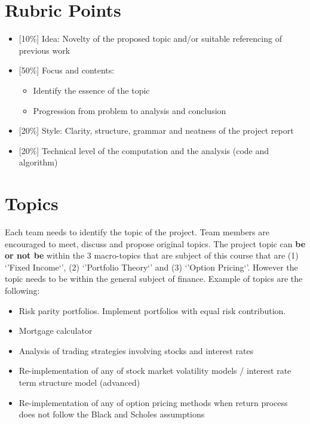 \documentclass[a4paper,11pt]{article} %
\begin{document}
\vspace{0.5cm}
\section{\textbf{Rubric Points}}
\begin{itemize}
	\item {[10\%] Idea: Novelty of the proposed topic and/or suitable referencing of previous work}
	\item {[50\%] Focus and contents: }
	\begin{itemize}
		\item Identify the essence of the topic
		\item Progression from problem to analysis and conclusion
	\end{itemize}

	\item {[20\%] Style: Clarity, structure, grammar and neatness of the project report}
	\item {[20\%] Technical level of the computation and the analysis (code and algorithm)}

\end{itemize}

\vspace{0.5cm}
\section{\textbf{Topics}}
Each team needs to identify the topic of the project. Team members are encouraged to meet, discuss and propose original topics. The project topic can \textbf{be or not be} within the 3 macro-topics that are subject of this course that are (1) `'Fixed Income`', (2) `'Portfolio Theory`' and (3) `'Option Pricing`'. However the topic needs to be within the general subject of finance.
Example of topics are the following:
\begin{itemize}
	\item Risk parity portfolios. Implement portfolios with equal risk contribution.
	\item Mortgage calculator
	\item Analysis of trading strategies involving stocks and interest rates
	\item Re-implementation of any of stock market volatility models / interest rate term structure model (advanced)
	\item Re-implementation of any of option pricing methods when return process does not follow the Black and Scholes assumptions
\end{itemize}
\end{document}
